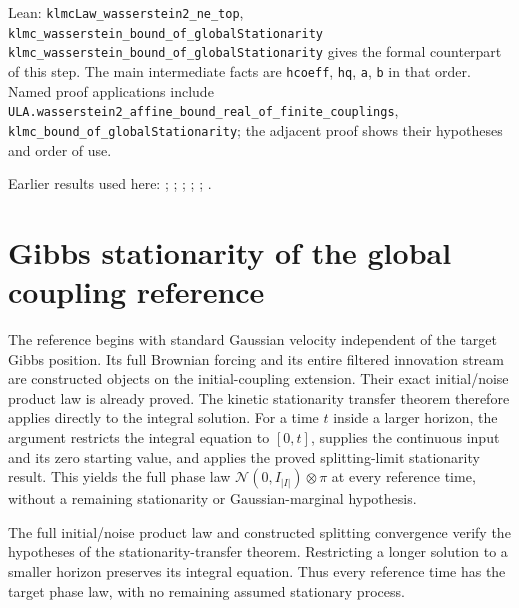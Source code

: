 \documentclass[11pt,a4paper]{article}
\begin{document}
\begin{leanbox}{Lean: \texttt{klmcLaw\_\allowbreak{}wasserstein2\_\allowbreak{}ne\_\allowbreak{}top}, \texttt{klmc\_\allowbreak{}wasserstein\_\allowbreak{}bound\_\allowbreak{}of\_\allowbreak{}globalStationarity}}
\texttt{klmc\_\allowbreak{}wasserstein\_\allowbreak{}bound\_\allowbreak{}of\_\allowbreak{}global\allowbreak{}Stationarity} gives the formal counterpart of this step. The main intermediate facts are \texttt{hcoeff}, \texttt{hq}, \texttt{a}, \texttt{b} in that order. Named proof applications include \texttt{ULA.\allowbreak{}wasserstein2\_\allowbreak{}affine\_\allowbreak{}bound\_\allowbreak{}real\_\allowbreak{}of\_\allowbreak{}finite\_\allowbreak{}couplings}, \texttt{klmc\_\allowbreak{}bound\_\allowbreak{}of\_\allowbreak{}global\allowbreak{}Stationarity}; the adjacent proof shows their hypotheses and order of use.
\end{leanbox}


Earlier results used here: \cite[Section~3.17.1]{LangevinLean2026ULASC}; \cite[Section~3.17.12]{LangevinLean2026ULASC}; \cite[Section~3.17.3]{LangevinLean2026ULASC}; \cite[Section~3.17.4]{LangevinLean2026ULASC}; \cite[Section~3.18.2]{LangevinLean2026ULASC}; \cite[Section~3.18.4]{LangevinLean2026ULASC}.

\section{\texorpdfstring{Gibbs stationarity of the global coupling reference}{Gibbs stationarity of the global coupling reference}}


The reference begins with standard Gaussian velocity independent of the target Gibbs position. Its full Brownian forcing and its entire filtered innovation stream are constructed objects on the initial-coupling extension. Their exact initial/\allowbreak{}noise product law is already proved. The kinetic stationarity transfer theorem therefore applies directly to the integral solution. For a time \(t\) inside a larger horizon, the argument restricts the integral equation to \([0,t]\), supplies the continuous input and its zero starting value, and applies the proved splitting-limit stationarity result. This yields the full phase law \(\mathcal N(0,I_{|I|})\otimes\pi\) at every reference time, without a remaining stationarity or Gaussian-marginal hypothesis.



The full initial/\allowbreak{}noise product law and constructed splitting convergence verify the hypotheses of the stationarity-transfer theorem. Restricting a longer solution to a smaller horizon preserves its integral equation. Thus every reference time has the target phase law, with no remaining assumed stationary process.
\end{document}
